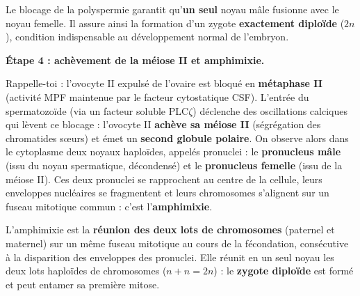 \documentclass[11pt]{article}
\newcommand{\cle}[1]{{\popxbold\color{popdark}#1}}
\begin{document}
\begin{propriete}
Le blocage de la polyspermie garantit qu'\textbf{un seul} noyau mâle fusionne avec le noyau femelle. Il assure ainsi la formation d'un zygote \textbf{exactement diploïde} ($2n$), condition indispensable au développement normal de l'embryon.
\end{propriete}

\textbf{Étape 4 : achèvement de la méiose II et amphimixie.}\par
Rappelle-toi : l'ovocyte II expulsé de l'ovaire est bloqué en \textbf{métaphase II} (activité MPF maintenue par le facteur cytostatique CSF). L'entrée du spermatozoïde (via un facteur soluble PLC$\zeta$) déclenche des oscillations calciques qui lèvent ce blocage : l'ovocyte II \textbf{achève sa méiose II} (ségrégation des chromatides sœurs) et émet un \textbf{second globule polaire}. On observe alors dans le cytoplasme deux noyaux haploïdes, appelés \cle{pronuclei} : le \textbf{pronucleus mâle} (issu du noyau spermatique, décondensé) et le \textbf{pronucleus femelle} (issu de la méiose II). Ces deux pronuclei se rapprochent au centre de la cellule, leurs enveloppes nucléaires se fragmentent et leurs chromosomes s'alignent sur un fuseau mitotique commun : c'est l'\textbf{amphimixie}.

\begin{definition}[Amphimixie]
L'\cle{amphimixie} est la \textbf{réunion des deux lots de chromosomes} (paternel et maternel) sur un même fuseau mitotique au cours de la fécondation, consécutive à la disparition des enveloppes des pronuclei. Elle réunit en un seul noyau les deux lots haploïdes de chromosomes ($n + n = 2n$) : le \textbf{zygote diploïde} est formé et peut entamer sa première mitose.
\end{definition}
\end{document}
